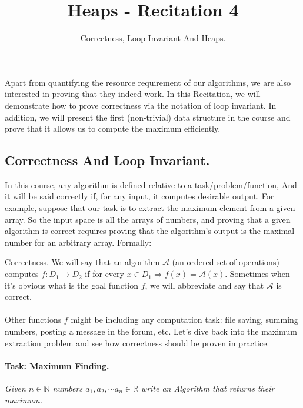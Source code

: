 \title{Heaps - Recitation 4} 
\author{Correctness, Loop Invariant And Heaps.}


  Apart from quantifying the resource requirement of our algorithms, we are also interested in proving that they indeed work. In this Recitation, we will demonstrate how to prove correctness via the notation of loop invariant. In addition, we will present the first (non-trivial) data structure in the course and prove that it allows us to compute the maximum efficiently.



\subsection*{Correctness And Loop Invariant.}
In this course, any algorithm is defined relative to a task/problem/function, And it will be said correctly if, for any input, it computes desirable output. For example, suppose that our task is to extract the maximum element from a given array. 
So the input space is all the arrays of numbers, and proving that a given algorithm is correct requires proving that the algorithm's output is the maximal number for an arbitrary array. Formally:  
\begin{defbox}{Correctness.}
We will say that an algorithm \( \mathcal{A}\) (an ordered set of operations) computes \( f:D_1 \rightarrow D_2 \) if for every \(x \in D_1 \Rightarrow f(x) = \mathcal{A}(x)\). Sometimes when it's obvious what is the goal function \(f\), we will abbreviate and say that \( \mathcal{A}\) is correct.       
\end{defbox}
\paragraph{}
Other functions \(f\) might be including any computation task: file saving, summing numbers, posting a message in the forum, etc. Let's dive back into the maximum extraction problem and see how correctness should be proven in practice.     
\paragraph{Task: Maximum Finding.} \textit{Given $n\in \mathbb{N}$ numbers $a_1, a_2, \cdots a_n \in \mathbb{R}$ write an Algorithm that returns their maximum.} 

